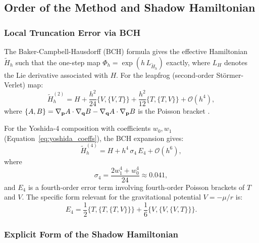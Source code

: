 
\subsection{Order of the Method and Shadow Hamiltonian}
\label{sec:order_and_shadow}
\label{sec:shadow}

\subsubsection{Local Truncation Error via BCH}
\label{sec:bch_analysis}

The Baker-Campbell-Hausdorff (BCH) formula gives the effective
Hamiltonian $\tilde{H}_h$ such that the one-step map
$\Phi_h = \exp(h\,L_{\tilde{H}_h})$ exactly, where
$L_H$ denotes the Lie derivative associated with $H$.
For the leapfrog (second-order Störmer-Verlet) map:
\begin{equation}
  \tilde{H}^{(2)}_h = H + \frac{h^2}{24}
    \bigl\{V,\{V,T\}\bigr\}
    + \frac{h^2}{12}\bigl\{T,\{T,V\}\bigr\}
    + \mathcal{O}(h^4),
  \label{eq:shadow_leapfrog}
\end{equation}
where $\{A,B\} = \nabla_{\mathbf{p}} A \cdot \nabla_{\mathbf{q}} B
- \nabla_{\mathbf{q}} A \cdot \nabla_{\mathbf{p}} B$ is the Poisson bracket
\citep{HairerLubichWanner2006}.

For the Yoshida-4 composition with coefficients $w_0, w_1$
(Equation~\ref{eq:yoshida_coeffs}), the BCH expansion gives:
\begin{equation}
  \tilde{H}^{(4)}_h = H + h^4\,\sigma_4\,E_4 + \mathcal{O}(h^6),
  \label{eq:shadow_yoshida}
\end{equation}
where
\begin{equation}
  \sigma_4 = \frac{2w_1^4 + w_0^4}{24}
  \approx 0.041,
  \label{eq:sigma4}
\end{equation}
and $E_4$ is a fourth-order error term involving fourth-order
Poisson brackets of $T$ and $V$. The specific form relevant for
the gravitational potential $V = -\mu/r$ is:
\begin{equation}
  E_4 = \frac{1}{2}\bigl\{T,\{T,\{T,V\}\}\bigr\}
       + \frac{1}{6}\bigl\{V,\{V,\{V,T\}\}\bigr\}.
  \label{eq:E4_brackets}
\end{equation}

\subsubsection{Explicit Form of the Shadow Hamiltonian}
\label{sec:shadow_explicit}

